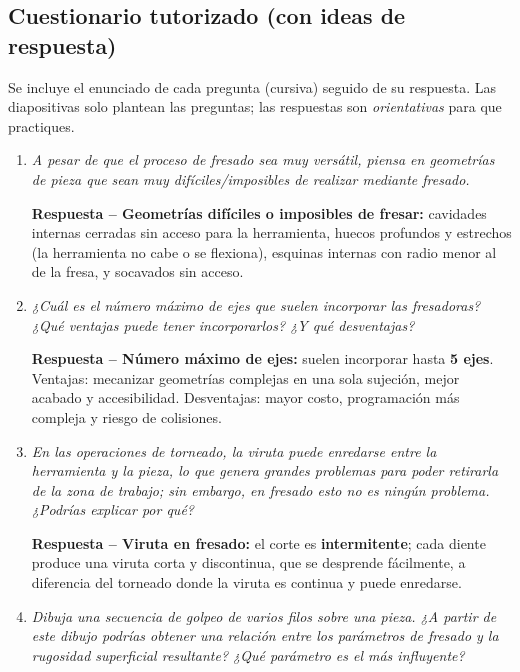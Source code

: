 \documentclass[12pt,a4paper]{article}
\begin{document}
\subsection{Cuestionario tutorizado (con ideas de respuesta)}
Se incluye el enunciado de cada pregunta (cursiva) seguido de su respuesta. Las
diapositivas solo plantean las preguntas; las respuestas son
\emph{orientativas} para que practiques.
\begin{enumerate}
	\item \textit{A pesar de que el proceso de fresado sea muy versátil, piensa en
		      geometrías de pieza que sean muy difíciles/imposibles de realizar
		      mediante
		      fresado.}\par
	      \textbf{Respuesta -- Geometrías difíciles o imposibles de fresar:}
	      cavidades internas
	      cerradas sin acceso para la herramienta, huecos profundos y estrechos
	      (la
	      herramienta no cabe o se flexiona), esquinas internas con radio menor al
	      de la
	      fresa, y socavados sin acceso.
	\item \textit{¿Cuál es el número máximo de ejes que suelen incorporar las
		      fresadoras? ¿Qué ventajas puede tener incorporarlos? ¿Y qué
		      desventajas?}\par
	      \textbf{Respuesta -- Número máximo de ejes:} suelen incorporar hasta
	      \textbf{5 ejes}.
	      Ventajas: mecanizar geometrías complejas en una sola sujeción, mejor
	      acabado y
	      accesibilidad. Desventajas: mayor costo, programación más compleja y
	      riesgo de
	      colisiones.
	\item \textit{En las operaciones de torneado, la viruta puede enredarse entre
		      la herramienta y la pieza, lo que genera grandes problemas para poder
		      retirarla
		      de la zona de trabajo; sin embargo, en fresado esto no es ningún
		      problema.
		      ¿Podrías explicar por qué?}\par
	      \textbf{Respuesta -- Viruta en fresado:} el corte es
	      \textbf{intermitente}; cada
	      diente produce una viruta corta y discontinua, que se desprende
	      fácilmente, a
	      diferencia del torneado donde la viruta es continua y puede enredarse.
	\item \textit{Dibuja una secuencia de golpeo de varios filos sobre una pieza.
		      ¿A partir de este dibujo podrías obtener una relación entre los
		      parámetros de
		      fresado y la rugosidad superficial resultante? ¿Qué parámetro es el
		      más
		      influyente?}\par

\end{enumerate}
\end{document}
